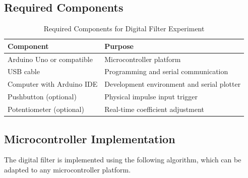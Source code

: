 \subsection{Required Components}

\begin{table}[H]
\centering
\caption{Required Components for Digital Filter Experiment}
\begin{tabular}{ll}
\toprule
\textbf{Component} & \textbf{Purpose} \\
\midrule
Arduino Uno or compatible & Microcontroller platform \\
USB cable & Programming and serial communication \\
Computer with Arduino IDE & Development environment and serial plotter \\
Pushbutton (optional) & Physical impulse input trigger \\
Potentiometer (optional) & Real-time coefficient adjustment \\
\bottomrule
\end{tabular}
\end{table}

\subsection{Microcontroller Implementation}

The digital filter is implemented using the following algorithm, which can be adapted to any microcontroller platform.

